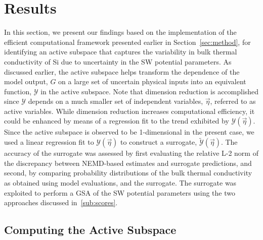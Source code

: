 \section{Results}
\label{sec:results}

In this section, we present our findings based on the implementation of the efficient computational framework 
presented earlier in Section~\ref{sec:method}, for identifying an active subspace that captures the variability
in bulk thermal conductivity of Si due to uncertainty in the SW potential parameters. As discussed earlier, the
active subspace helps transform the dependence of the model output, $G$ on a large set of uncertain physical
inputs into an equivalent function, $\mathcal{Y}$ in the active subspace. Note that dimension reduction is
accomplished since $\mathcal{Y}$ depends on a much smaller set of independent variables, $\vec\eta$,
referred to as active variables. While dimension reduction increases computational efficiency, it could be enhanced
by means of a regression fit to the trend exhibited by $\mathcal{Y}(\vec{\eta})$. Since the active subspace is
observed to be 1-dimensional in the present case, we used a linear regression fit to $\mathcal{Y}(\vec{\eta})$
to construct a surrogate, $\tilde{\mathcal{Y}}(\vec{\eta})$.
The accuracy of the surrogate was assessed by first evaluating the 
relative L-2 norm of the discrepancy between NEMD-based estimates and surrogate predictions,
and second, by comparing probability distributions of the bulk thermal conductivity as obtained using
model evaluations, and the surrogate. The surrogate was exploited to perform a GSA of the SW
potential parameters using the two approaches discussed in~\ref{sub:scores}.

\subsection{Computing the Active Subspace}
\label{sub:cas}

